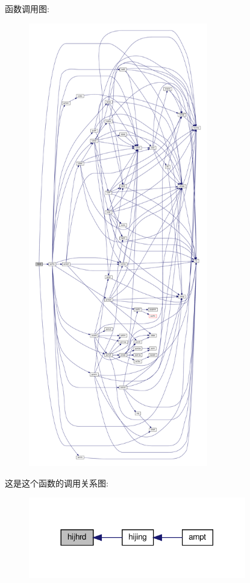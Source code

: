 函数调用图\+:
\nopagebreak
\begin{figure}[H]
\begin{center}
\leavevmode
\includegraphics[height=550pt]{hijhrd_8f90_abc0a6b65d817ac94b4637241cfc19e88_cgraph}
\end{center}
\end{figure}
这是这个函数的调用关系图\+:
\nopagebreak
\begin{figure}[H]
\begin{center}
\leavevmode
\includegraphics[width=269pt]{hijhrd_8f90_abc0a6b65d817ac94b4637241cfc19e88_icgraph}
\end{center}
\end{figure}
